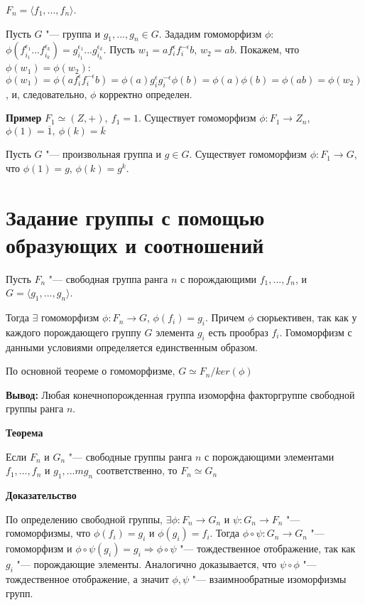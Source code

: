 \documentclass{article}
\begin{document}
$F_n = \langle f_1, ..., f_n \rangle$.

Пусть $G$ "--- группа и $g_1, ..., g_n \in G$. Зададим гомоморфизм $\phi$: $\phi(f_{i_1}^{\epsilon_1}...f_{i_k}^{\epsilon_k}) = g_{i_1}^{\epsilon_1}...g_{i_k}^{\epsilon_k}$. Пусть $w_1 = af_i^{\epsilon}f_i^{-\epsilon}b$, $w_2 = ab$. Покажем, что $\phi(w_1) = \phi(w_2)$: $\phi(w_1) = \phi(af_i^{\epsilon}f_i^{-\epsilon}b) = \phi(a)g_i^{\epsilon}g_i^{-\epsilon}\phi(b) = \phi(a)\phi(b) = \phi(ab) = \phi(w_2)$, и, следовательно, $\phi$ корректно определен.

\vspace{10pt}

\textbf{Пример}
$F_1 \simeq (Z, +), \  f_1 = 1$. Существует гомоморфизм $\phi: F_1 \rightarrow Z_n$, $\phi(1) = \overline{1}, \  \phi(k) = \overline{k}$

Пусть $G$ "--- произвольная группа и $g \in G$. Существует гомоморфизм $\phi: F_1 \rightarrow G$, что $\phi(1) = g$, $\phi(k) = g^k$.

\section{Задание группы с помощью образующих и соотношений}

Пусть $F_n$ "--- свободная группа ранга $n$ с порождающими $f_1, ..., f_n$, и $G = \langle g_1, ..., g_n \rangle$.

Тогда $\exists$ гомоморфизм $\phi: F_n \rightarrow G$, $\phi(f_i) = g_i$. Причем $\phi$ сюрьективен, так как у каждого порождающего группу $G$ элемента $g_i$ есть прообраз $f_i$. Гомоморфизм с данными условиями определяется единственным образом.

По основной теореме о гомоморфизме, $G \simeq F_n/ker(\phi)$

\textbf{Вывод:} Любая конечнопорожденная группа изоморфна факторгруппе свободной группы ранга $n$.

\vspace{10pt}

\textbf{Теорема}

Если $F_n$ и $G_n$ "--- свободные группы ранга $n$ с порождающими элементами $f_1, ..., f_n$ и $g_1, ...m g_n$ соответственно, то $F_n \simeq G_n$

\textbf{Доказательство}

По определению свободной группы, $\exists \phi: F_n \rightarrow G_n$ и $\psi: G_n \rightarrow F_n$ "--- гомоморфизмы, что $\phi(f_i) = g_i$ и $\phi(g_i) = f_i$. Тогда $\phi \circ \psi: G_n \rightarrow G_n$ "--- гомоморфизм и $\phi \circ \psi(g_i) = g_i \Rightarrow \phi \circ \psi$ "--- тождественное отображение, так как $g_i$ "--- порождающие элементы. Аналогично доказывается, что $\psi \circ \phi$ "--- тождественное отображение, а значит $\phi, \psi$ "--- взаимнообратные изоморфизмы групп.
\end{document}
